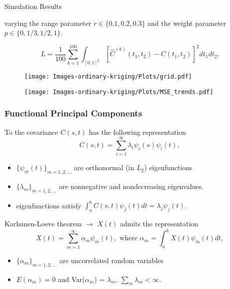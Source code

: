 \documentclass{beamer}
\begin{document}
\begin{frame}[t]{Simulation Results}

		varying the range parameter $r \in \{0.1, 0.2, 0.3\}$ and the weight parameter $p \in \{0, 1/3, 1/2, 1\}$.

		\begin{equation*}
			L = \frac{1}{100}\sum_{k=1}^{100}\int_{[0,1]^2} [\hat{C}^{(k)}(t_1, t_2) - C(t_1,t_2)]^2dt_1dt_2.
		\end{equation*}
	\begin{minipage}{0.48\textwidth}
		\begin{figure}[h]
			\begin{center}
				\texttt{[image: Images-ordinary-kriging/Plots/grid.pdf]}
			\end{center}
		\end{figure}
	\end{minipage}
\begin{minipage}{0.48\textwidth}
		\begin{figure}[h]
			\begin{center}
				\texttt{[image: Images-ordinary-kriging/Plots/MSE\_trends.pdf]}
			\end{center}
		\end{figure}
	\end{minipage}

\end{frame}

\begin{frame}
	\frametitle{Functional Principal Components}
	To the covariance $C(s,t)$ has the following representation
	\begin{equation*}
	 C(s,t) = \sum_{i=1}^{\infty}\lambda_i\psi_i(s)\psi_i(t),
	\end{equation*}
	\begin{itemize}
	\item  $\{\psi_m(t)\}_{m=1,2,\ldots}$ are orthonormal (in $L_2$) eigenfunctions
	\item  $\{\lambda_m \}_{m=1,2,\ldots}$ are nonnegative and nondecreasing eigenvalues.
	\item eigenfunctions satisfy $\int_a^bC(s,t)\psi_j(t)dt = \lambda_j\psi_j(t)$.
	\end{itemize}
	Karhunen-Loeve theorem $\rightarrow$ $X(t)$ admits the representation
	\begin{equation*}
	X(t) =  \sum_{m=1}^{\infty}\alpha_m \psi_m(t), \mbox{ where  } \alpha_m = \int_a^b X(t) \psi_m(t)dt,
	\end{equation*}
	\begin{itemize}
	\item $\{\alpha_m \}_{m=1,2,\ldots}$ are uncorrelated random variables
	\item $E(\alpha_m)=0$ and Var($\alpha_m$) = $\lambda_m$, $\sum_m \lambda_m < \infty$.
	\end{itemize}
\end{frame}
\end{document}
